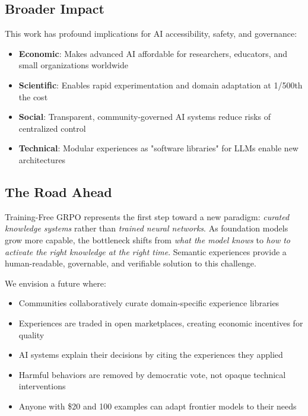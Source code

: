 \documentclass[11pt,a4paper]{article}
\begin{document}
\subsection{Broader Impact}

This work has profound implications for AI accessibility, safety, and governance:

\begin{itemize}
    \item \textbf{Economic}: Makes advanced AI affordable for researchers, educators, and small organizations worldwide

    \item \textbf{Scientific}: Enables rapid experimentation and domain adaptation at 1/500th the cost

    \item \textbf{Social}: Transparent, community-governed AI systems reduce risks of centralized control

    \item \textbf{Technical}: Modular experiences as "software libraries" for LLMs enable new architectures
\end{itemize}

\subsection{The Road Ahead}

Training-Free GRPO represents the first step toward a new paradigm: \textit{curated knowledge systems} rather than \textit{trained neural networks}. As foundation models grow more capable, the bottleneck shifts from \textit{what the model knows} to \textit{how to activate the right knowledge at the right time}. Semantic experiences provide a human-readable, governable, and verifiable solution to this challenge.

We envision a future where:
\begin{itemize}
    \item Communities collaboratively curate domain-specific experience libraries
    \item Experiences are traded in open marketplaces, creating economic incentives for quality
    \item AI systems explain their decisions by citing the experiences they applied
    \item Harmful behaviors are removed by democratic vote, not opaque technical interventions
    \item Anyone with \$20 and 100 examples can adapt frontier models to their needs
\end{itemize}
\end{document}

